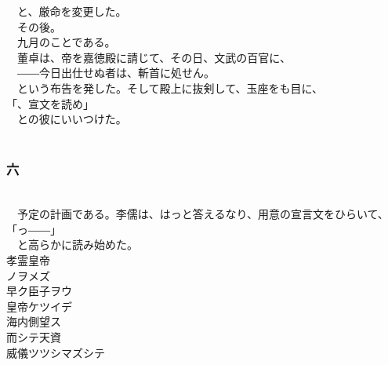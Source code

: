 \documentclass[
  paper=a5,
  fontsize=10pt,
  jafontsize=9.5pt,
  tate,                  %
  open_bracket_pos=nibu, %
]{jlreq}
\begin{document}
　と、厳命を変更した。\\


　その後。\\


　九月のことである。\\


　董卓は、帝を嘉徳殿に請じて、その日、文武の百官に、\\


　――今日出仕せぬ者は、斬首に処せん。\\


　という布告を発した。そして殿上に抜剣して、玉座をも目に、\\


「、宣文を読め」\\


　との彼にいいつけた。\\

\\

\subsubsection{六}

\\


　予定の計画である。李儒は、はっと答えるなり、用意の宣言文をひらいて、\\


「っ――」\\


　と高らかに読み始めた。\\



孝霊皇帝\\

ノヲメズ\\


早ク臣子ヲウ\\


皇帝ケツイデ\\


海内側望ス\\


而シテ天資\\


威儀ツツシマズシテ\\
\end{document}
